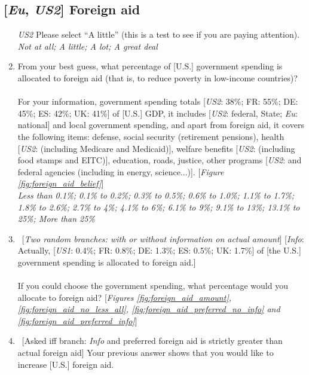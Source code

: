 \documentclass[12pt,english]{article}
\begin{document}
\subsection*{[\textit{Eu}, \textit{US2}] Foreign aid}
\begin{enumerate}[resume] 
    \item [\textit{US2}] Please select ``A little'' (this is a test to see if you are paying attention).
    \\ \textit{Not at all; A little; A lot; A great deal}
    \item \label{q:foreign_aid_belief} From your best guess, what percentage of [U.S.] government spending is allocated to foreign aid (that is, to reduce poverty in low-income countries)?\\
 \\
    For your information, government spending totals [\textit{US2}: 38\%; FR: 55\%; DE: 45\%; ES: 42\%; UK: 41\%] of [U.S.] GDP, it includes [\textit{US2}: federal, State; \textit{Eu}: national] and local government spending, and apart from foreign aid, it covers the following items: defense, social security (retirement pensions), health [\textit{US2}: (including Medicare and Medicaid)], welfare benefits [\textit{US2}: (including food stamps and EITC)], education, roads, justice, other programs [\textit{US2}: and federal agencies (including in energy, science...)]. [\textit{Figure \ref{fig:foreign_aid_belief}}]
   \\ \textit{Less than 0.1\%; 0.1\% to 0.2\%; 0.3\% to 0.5\%; 0.6\% to 1.0\%; 1.1\% to 1.7\%; 1.8\% to 2.6\%; 2.7\% to 4\%; 4.1\% to 6\%; 6.1\% to 9\%; 9.1\% to 13\%; 13.1\% to 25\%; More than 25\%}
   \item \label{q:foreign_aid_preferred} ~[\textit{Two random branches: with or without information on actual amount}] [\textit{Info}: Actually, [\textit{US1}: 0.4\%; FR: 0.8\%; DE: 1.3\%; ES: 0.5\%; UK: 1.7\%] of [the U.S.] government spending is allocated to foreign aid.]\\
 \\
   If you could choose the government spending, what percentage would you allocate to foreign aid? [\textit{Figures \ref{fig:foreign_aid_amount}, \ref{fig:foreign_aid_no_less_all}, \ref{fig:foreign_aid_preferred_no_info} and \ref{fig:foreign_aid_preferred_info}}]
  \item \label{q:foreign_aid_raise_how} ~[Asked iff branch: \textit{Info} and preferred foreign aid is strictly greater than actual foreign aid]  Your previous answer shows that you would like to increase [U.S.] foreign aid.\\

\end{enumerate}
\end{document}
